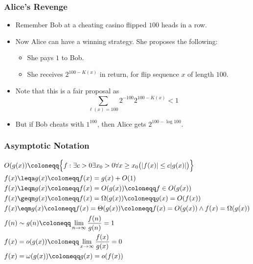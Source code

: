 \documentclass[UTF8,11pt,colorlinks,compress,openany]{beamer}%
\begin{document}
\begin{frame}\frametitle{Alice's Revenge}
\begin{itemize}
	\item Remember Bob at a cheating casino flipped $100$ heads in a row.
	\item Now Alice can have a winning strategy. She proposes the following:
	\begin{itemize}
		\item She pays $1$ to Bob.
		\item She receives $2^{100-K(x)}$ in return, for flip sequence $x$ of length $100$.
	\end{itemize}
	\item Note that this is a fair proposal as
	\[\sum_{\ell(x)=100}2^{-100}2^{100-K(x)}<1\]
	\item But if Bob cheats with $1^{100}$, then Alice gets $2^{100-\log 100}$.
\end{itemize}
\end{frame}

\begin{frame}\frametitle{Asymptotic Notation}
\begin{align*}
&O(g(x))\coloneqq \Big\{f:\exists c>0\exists x_0>0\forall x\geq x_0\big(|f(x)|\leq c |g(x)|\big)\Big\}\\
&f(x)\leqa g(x)\coloneqq f(x)=g(x)+O(1)\\
&f(x)\leqm g(x)\coloneqq f(x)=O(g(x))\coloneqq f\in O(g(x))\\
&f(x)\geqm g(x)\coloneqq f(x)=\Omega(g(x))\coloneqq g(x)=O(f(x))\\
&f(x)\eqm g(x)\coloneqq f(x)=\Theta(g(x))\coloneqq f(x)=O(g(x))\wedge f(x)=\Omega(g(x))\\
&f(n)\sim g(n)\coloneqq \lim\limits_{n\to\infty}\frac{f(n)}{g(n)}=1\\
&f(x)=o(g(x))\coloneqq \lim\limits_{x\to\infty}\frac{f(x)}{g(x)}=0\\
&f(x)=\omega(g(x))\coloneqq g(x)=o(f(x))
\end{align*}	
\end{frame}
\end{document}
